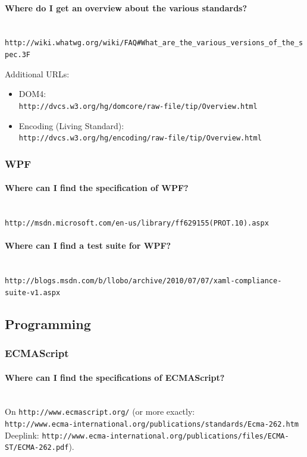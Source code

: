 \documentclass[10pt]{scrbook}
\begin{document}
\paragraph{Where do I get an overview about the various standards?} ~ \\
\verb|http://wiki.whatwg.org/wiki/FAQ#What_are_the_various_versions_of_the_spec.3F|

Additional URLs:
\begin{itemize}
\item DOM4: \\
\verb|http://dvcs.w3.org/hg/domcore/raw-file/tip/Overview.html|
\item Encoding (Living Standard): \\
\verb|http://dvcs.w3.org/hg/encoding/raw-file/tip/Overview.html|
\end{itemize}

\subsubsection{WPF}

\paragraph{Where can I find the specification of WPF?} ~ \\
\verb|http://msdn.microsoft.com/en-us/library/ff629155(PROT.10).aspx|

\paragraph{Where can I find a test suite for WPF?} ~ \\
\verb|http://blogs.msdn.com/b/llobo/archive/2010/07/07/xaml-compliance-suite-v1.aspx|

\subsection{Programming}

\subsubsection{ECMAScript}

\paragraph{Where can I find the specifications of ECMAScript?} ~ \\
On \verb|http://www.ecmascript.org/| (or more exactly: \\
\verb|http://www.ecma-international.org/publications/standards/Ecma-262.htm| \\
Deeplink: \verb|http://www.ecma-international.org/publications/files/ECMA-ST/ECMA-262.pdf|).
\end{document}
